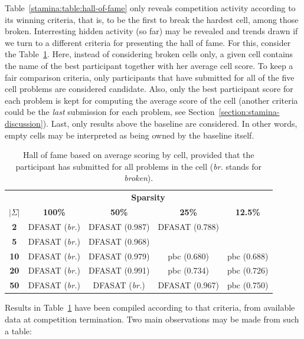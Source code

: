 Table~\ref{stamina:table:hall-of-fame} only reveals competition activity according to its winning criteria, that is, to be the first to break the hardest cell, among those broken. Interresting hidden activity (so far) may be revealed and trends drawn if we turn to a different criteria for presenting the hall of fame. For this, consider the Table~\ref{stamina:table:hall-of-fame-2}. Here, instead of considering broken cells only, a given cell contains the name of the best participant together with her average cell score. To keep a fair comparison criteria, only participants that have submitted for all of the five cell problems are considered candidate. Also, only the best participant score for each problem is kept for computing the average score of the cell (another criteria could be the \emph{last} submission for each problem, see Section~\ref{section:stamina-discussion}). Last, only results above the baseline are considered. In other words, empty cells may be interpreted as being owned by the baseline itself. 

\begin{table}[H]
\begin{center}
\begin{tabular}{c|c c c c}
&\multicolumn{4}{|c}{\textbf{Sparsity}}\\ 
\textbf{$|\Sigma|$} & \textbf{100\%} & \textbf{50\%} & \textbf{25\%} & \textbf{12.5\%}\\
\hline
\textbf{2}  & DFASAT (\emph{br.}) & DFASAT (0.987)      & DFASAT (0.788) &  \\
\textbf{5}  & DFASAT (\emph{br.}) & DFASAT (0.968)      &                &  \\
\textbf{10} & DFASAT (\emph{br.}) & DFASAT (0.979)      & pbc (0.680)    & pbc (0.688) \\
\textbf{20} & DFASAT (\emph{br.}) & DFASAT (0.991)      & pbc (0.734)    & pbc (0.726) \\
\textbf{50} & DFASAT (\emph{br.}) & DFASAT (\emph{br.}) & DFASAT (0.967) & pbc (0.750) \\
\end{tabular}
\end{center}
\caption{Hall of fame based on average scoring by cell, provided that the participant has submitted for all problems in the cell (\emph{br.} stands for \emph{broken}).\label{stamina:table:hall-of-fame-2}}
\end{table}

Results in Table~\ref{stamina:table:hall-of-fame-2} have been compiled according to that criteria, from available data at competition termination. Two main observations may be made from such a table: 

